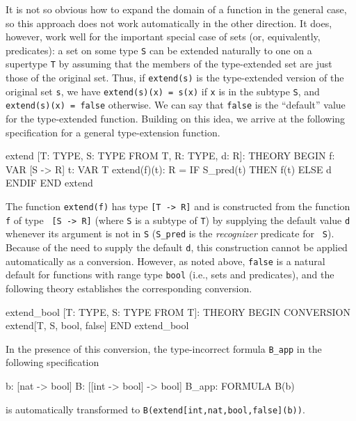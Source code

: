 It is not so obvious how to expand the domain of a function in the general
case, so this approach does not work automatically in the other direction.
It does, however, work well for the important special case of sets (or,
equivalently, predicates): a set on some type \texttt{S} can be extended
naturally to one on a supertype \texttt{T} by assuming that the members of
the type-extended set are just those of the original set.  Thus, if
\texttt{extend(s)} is the type-extended version of the original set
\texttt{s}, we have \texttt{extend(s)(x) = s(x)} if \texttt{x} is in the
subtype \texttt{S}, and \texttt{extend(s)(x) = false} otherwise.  We can
say that \texttt{false} is the ``default'' value for the type-extended
function.  Building on this idea, we arrive at the following specification
for a general type-extension function.
\begin{pvsex}
  extend [T: TYPE, S: TYPE FROM T, R: TYPE, d: R]: THEORY
   BEGIN
    f: VAR [S -> R]
    t: VAR T
    extend(f)(t): R = IF S_pred(t) THEN f(t) ELSE d ENDIF
   END extend
\end{pvsex}
The function \texttt{extend(f)} has type \texttt{[T -> R]} and is
constructed from the function \texttt{f} of type \texttt{ [S -> R]} (where
\texttt{S} is a subtype of \texttt{T}) by supplying the default value
\texttt{d} whenever its argument is not in \texttt{S} (\texttt{S\_pred} is
the {\em recognizer\/} predicate for \texttt{ S}).  Because of the need to
supply the default \texttt{d}, this construction cannot be applied
automatically as a conversion.  However, as noted above, \texttt{false} is
a natural default for functions with range type \texttt{bool} (i.e., sets
and predicates), and the following theory establishes the corresponding
conversion.
\begin{pvsex}
extend_bool [T: TYPE, S: TYPE FROM T]: THEORY
 BEGIN
  CONVERSION extend[T, S, bool, false]
 END extend_bool
\end{pvsex}
In the presence of this conversion, the type-incorrect formula
\texttt{B\_app} in the following specification
\begin{pvsex}
  b: [nat -> bool]
  B: [[int -> bool] -> bool]
  B_app: FORMULA B(b)
\end{pvsex}
is automatically transformed to \texttt{B(extend[int,nat,bool,false](b))}.

